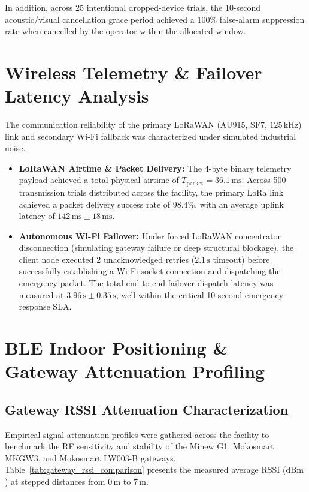 In addition, across 25 intentional dropped-device trials, the 10-second acoustic/visual cancellation grace period achieved a $100\%$ false-alarm suppression rate when cancelled by the operator within the allocated window.

\section{Wireless Telemetry \& Failover Latency Analysis}
The communication reliability of the primary LoRaWAN (AU915, SF7, $125\,\text{kHz}$) link and secondary Wi-Fi fallback was characterized under simulated industrial noise. 

\begin{itemize}
    \item \textbf{LoRaWAN Airtime \& Packet Delivery:} The 4-byte binary telemetry payload achieved a total physical airtime of $T_{\text{packet}} = 36.1\,\text{ms}$. Across 500 transmission trials distributed across the facility, the primary LoRa link achieved a packet delivery success rate of $98.4\%$, with an average uplink latency of $142\,\text{ms} \pm 18\,\text{ms}$.
    \item \textbf{Autonomous Wi-Fi Failover:} Under forced LoRaWAN concentrator disconnection (simulating gateway failure or deep structural blockage), the client node executed 2 unacknowledged retries ($2.1\,\text{s}$ timeout) before successfully establishing a Wi-Fi socket connection and dispatching the emergency packet. The total end-to-end failover dispatch latency was measured at $3.96\,\text{s} \pm 0.35\,\text{s}$, well within the critical 10-second emergency response SLA.
\end{itemize}

\section{BLE Indoor Positioning \& Gateway Attenuation Profiling}

\subsection{Gateway RSSI Attenuation Characterization}
\label{sec:gateway_rssi_comparison}
Empirical signal attenuation profiles were gathered across the facility to benchmark the RF sensitivity and stability of the Minew G1, Mokosmart MKGW3, and Mokosmart LW003-B gateways. Table~\ref{tab:gateway_rssi_comparison} presents the measured average RSSI ($\text{dBm}$) at stepped distances from $0\,\text{m}$ to $7\,\text{m}$.

